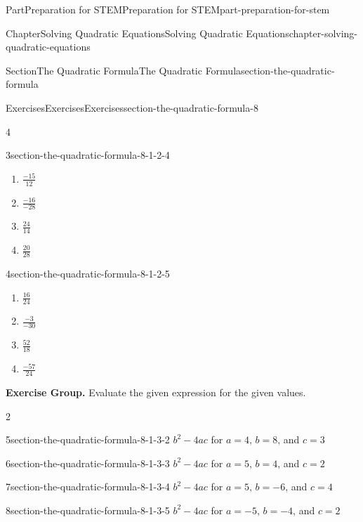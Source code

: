 \documentclass[twoside,10pt,]{book}
\numberwithin{equation}{section}
\begin{document}
\begin{partptx}{Part}{Preparation for STEM}{}{Preparation for STEM}{}{}{part-preparation-for-stem}
\begin{chapterptx}{Chapter}{Solving Quadratic Equations}{}{Solving Quadratic Equations}{}{}{chapter-solving-quadratic-equations}
\begin{sectionptx}{Section}{The Quadratic Formula}{}{The Quadratic Formula}{}{}{section-the-quadratic-formula}
\begin{exercises-subsection}{Exercises}{Exercises}{}{Exercises}{}{}{section-the-quadratic-formula-8}
\begin{exercisegroupcol}{4}
\begin{divisionexerciseegcol}{3}{}{}{section-the-quadratic-formula-8-1-2-4}
\begin{enumerate}[font=\bfseries,label=(\alph*),ref=\alph*,topsep=-\parskip, before={\vspace{-\baselineskip}}, after={\vspace{\baselineskip}}]
\item{}\(\frac{-15}{12}\)%
\item{}\(\frac{-16}{-28}\)%
\item{}\(\frac{24}{14}\)%
\item{}\(\frac{20}{28}\)%
\end{enumerate}%
\end{divisionexerciseegcol}%
\begin{divisionexerciseegcol}{4}{}{}{section-the-quadratic-formula-8-1-2-5}%
\begin{enumerate}[font=\bfseries,label=(\alph*),ref=\alph*,topsep=-\parskip, before={\vspace{-\baselineskip}}, after={\vspace{\baselineskip}}]%
\item{}\(\frac{16}{24}\)%
\item{}\(\frac{-3}{-30}\)%
\item{}\(\frac{52}{18}\)%
\item{}\(\frac{-57}{24}\)%
\end{enumerate}%
\end{divisionexerciseegcol}%
\end{exercisegroupcol}
\par\medskip\noindent
\par\medskip\noindent%
\textbf{Exercise Group.}\space\space%
Evaluate the given expression for the given values.%
\begin{exercisegroupcol}{2}
\begin{divisionexerciseegcol}{5}{}{}{section-the-quadratic-formula-8-1-3-2}%
\({b^{2}-4ac}\) for \(a=4\text{,}\) \(b=8\text{,}\) and \(c=3\)%
\end{divisionexerciseegcol}%
\begin{divisionexerciseegcol}{6}{}{}{section-the-quadratic-formula-8-1-3-3}%
\({b^{2}-4ac}\) for \(a=5\text{,}\) \(b=4\text{,}\) and \(c=2\)%
\end{divisionexerciseegcol}%
\begin{divisionexerciseegcol}{7}{}{}{section-the-quadratic-formula-8-1-3-4}%
\({b^{2}-4ac}\) for \(a=5\text{,}\) \(b=-6\text{,}\) and \(c=4\)%
\end{divisionexerciseegcol}%
\begin{divisionexerciseegcol}{8}{}{}{section-the-quadratic-formula-8-1-3-5}%
\({b^{2}-4ac}\) for \(a=-5\text{,}\) \(b=-4\text{,}\) and \(c=2\)%
\end{divisionexerciseegcol}%
\end{exercisegroupcol}

\end{exercises-subsection}
\end{sectionptx}
\end{chapterptx}
\end{partptx}
\end{document}
